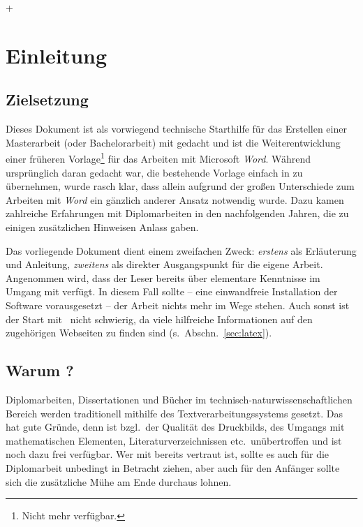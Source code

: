 +\chapter{Einleitung}
\label{cha:Einleitung}

\section{Zielsetzung}
Dieses Dokument ist als vorwiegend technische Starthilfe für das
Erstellen einer Masterarbeit (oder Bachelorarbeit) mit \latex
gedacht und ist die Weiterentwicklung einer früheren
Vorlage\footnote{Nicht mehr verfügbar.} für das Arbeiten mit
Microsoft \emph{Word}. Während ursprünglich daran gedacht war, die
bestehende Vorlage einfach in \latex zu übernehmen, wurde rasch
klar, dass allein aufgrund der großen Unterschiede zum Arbeiten
mit \emph{Word} ein gänzlich anderer Ansatz notwendig wurde. Dazu
kamen zahlreiche Erfahrungen mit Diplomarbeiten in den
nachfolgenden Jahren, die zu einigen zusätzlichen Hinweisen Anlass gaben.

Das vorliegende Dokument dient einem zweifachen Zweck: 
\emph{erstens} als Erläuterung und Anleitung, \emph{zweitens} als
direkter Ausgangspunkt für die eigene Arbeit. Angenommen wird,
dass der Leser bereits über elementare Kenntnisse im Umgang mit
\latex verfügt. In diesem Fall sollte -- eine einwandfreie
Installation der Software vorausgesetzt -- der Arbeit nichts mehr
im Wege stehen. Auch sonst ist der Start mit \latex\ nicht
schwierig, da viele hilfreiche Informationen auf den zugehörigen
Webseiten zu finden sind (s.\ Abschn.~\ref{sec:latex}).





\section{Warum {\latex}?}

Diplomarbeiten, Dissertationen und Bücher im
technisch-natur\-wissen\-schaft\-lichen Bereich werden
traditionell mithilfe des Textverarbeitungssystems \latex
\cite{Lamport94,Lamport95} gesetzt. Das hat gute Gründe, denn
\latex ist bzgl.\ der Qualität des Druckbilds, des Umgangs mit
mathematischen Elementen, Literaturverzeichnissen etc.\
unübertroffen und ist noch dazu frei verfügbar. Wer mit \latex
bereits vertraut ist, sollte es auch für die Diplomarbeit
unbedingt in Betracht ziehen, aber auch für den Anfänger sollte
sich die zusätzliche Mühe am Ende durchaus lohnen.

